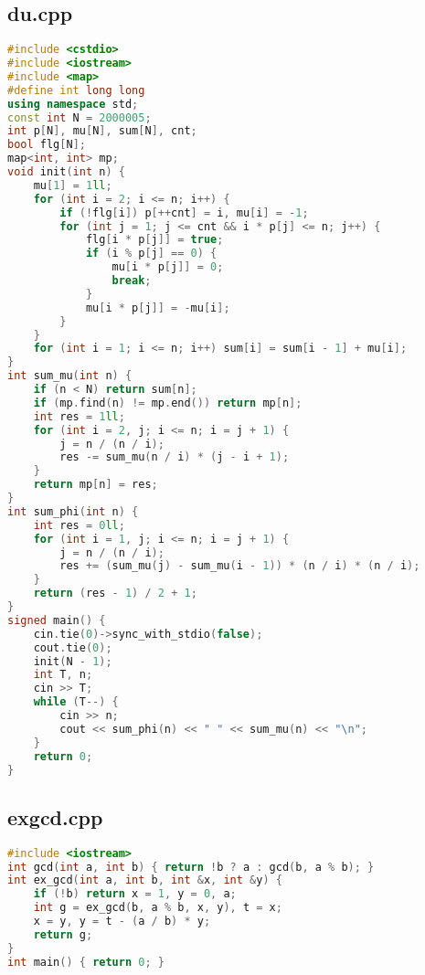 \documentclass[9pt, a4paper, oneside]{book}
\begin{document}
\subsection{du.cpp}
\begin{lstlisting}[language={C++}]
#include <cstdio>
#include <iostream>
#include <map>
#define int long long
using namespace std;
const int N = 2000005;
int p[N], mu[N], sum[N], cnt;
bool flg[N];
map<int, int> mp;
void init(int n) {
    mu[1] = 1ll;
    for (int i = 2; i <= n; i++) {
        if (!flg[i]) p[++cnt] = i, mu[i] = -1;
        for (int j = 1; j <= cnt && i * p[j] <= n; j++) {
            flg[i * p[j]] = true;
            if (i % p[j] == 0) {
                mu[i * p[j]] = 0;
                break;
            }
            mu[i * p[j]] = -mu[i];
        }
    }
    for (int i = 1; i <= n; i++) sum[i] = sum[i - 1] + mu[i];
}
int sum_mu(int n) {
    if (n < N) return sum[n];
    if (mp.find(n) != mp.end()) return mp[n];
    int res = 1ll;
    for (int i = 2, j; i <= n; i = j + 1) {
        j = n / (n / i);
        res -= sum_mu(n / i) * (j - i + 1);
    }
    return mp[n] = res;
}
int sum_phi(int n) {
    int res = 0ll;
    for (int i = 1, j; i <= n; i = j + 1) {
        j = n / (n / i);
        res += (sum_mu(j) - sum_mu(i - 1)) * (n / i) * (n / i);
    }
    return (res - 1) / 2 + 1;
}
signed main() {
    cin.tie(0)->sync_with_stdio(false);
    cout.tie(0);
    init(N - 1);
    int T, n;
    cin >> T;
    while (T--) {
        cin >> n;
        cout << sum_phi(n) << " " << sum_mu(n) << "\n";
    }
    return 0;
}\end{lstlisting}
\subsection{exgcd.cpp}
\begin{lstlisting}[language={C++}]
#include <iostream>
int gcd(int a, int b) { return !b ? a : gcd(b, a % b); }
int ex_gcd(int a, int b, int &x, int &y) {
    if (!b) return x = 1, y = 0, a;
    int g = ex_gcd(b, a % b, x, y), t = x;
    x = y, y = t - (a / b) * y;
    return g;
}
int main() { return 0; }\end{lstlisting}
\end{document}

